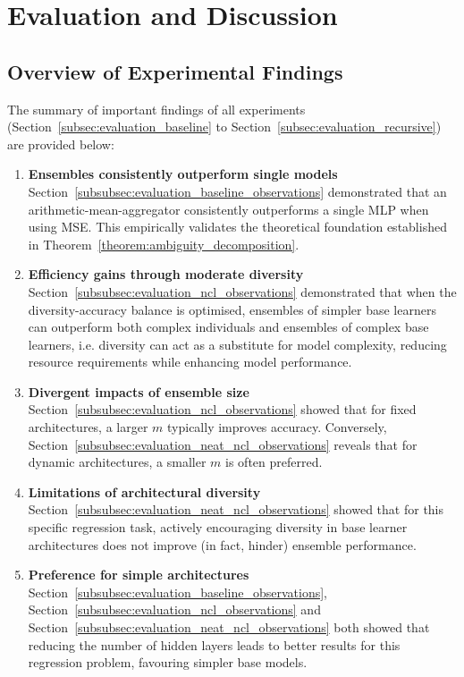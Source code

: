 \section{Evaluation and Discussion}
\label{sec:evaluation}


\subsection{Overview of Experimental Findings}
The summary of important findings of all experiments (Section~\ref{subsec:evaluation_baseline} to Section~\ref{subsec:evaluation_recursive}) are provided below: 
\begin{enumerate}
    \item \textbf{Ensembles consistently outperform single models} \\
    Section~\ref{subsubsec:evaluation_baseline_observations} demonstrated that an arithmetic-mean-aggregator consistently outperforms a single MLP when using MSE. This empirically validates the theoretical foundation established in Theorem~\ref{theorem:ambiguity_decomposition}. 

    \item \textbf{Efficiency gains through moderate diversity} \\
    Section~\ref{subsubsec:evaluation_ncl_observations} demonstrated that when the diversity-accuracy balance is optimised, ensembles of simpler base learners can outperform both complex individuals and ensembles of complex base learners, i.e. diversity can act as a substitute for model complexity, reducing resource requirements while enhancing model performance. 

    \item \textbf{Divergent impacts of ensemble size} \\
    Section~\ref{subsubsec:evaluation_ncl_observations} showed that for fixed architectures, a larger $m$ typically improves accuracy. Conversely, Section~\ref{subsubsec:evaluation_neat_ncl_observations} reveals that for dynamic architectures, a smaller $m$ is often preferred. 

    \item \textbf{Limitations of architectural diversity} \\
    Section~\ref{subsubsec:evaluation_neat_ncl_observations} showed that for this specific regression task, actively encouraging diversity in base learner architectures does not improve (in fact, hinder) ensemble performance. 

    \item \textbf{Preference for simple architectures} \\
    Section~\ref{subsubsec:evaluation_baseline_observations}, Section~\ref{subsubsec:evaluation_ncl_observations} and Section~\ref{subsubsec:evaluation_neat_ncl_observations} both showed that reducing the number of hidden layers leads to better results for this regression problem, favouring simpler base models. 


\end{enumerate}

